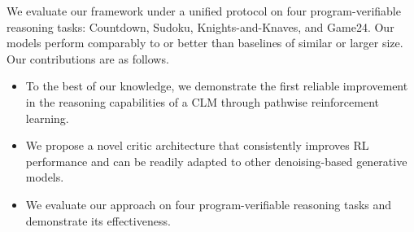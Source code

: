 

We evaluate our framework under a unified protocol on four program-verifiable reasoning tasks: Countdown, Sudoku, Knights-and-Knaves, and Game24. 
Our models perform comparably to or better than baselines of similar or larger size. Our contributions are as follows.
\begin{itemize}
    \item To the best of our knowledge, we demonstrate the first reliable improvement in the reasoning capabilities of a CLM through pathwise reinforcement learning.
    \item We propose a novel critic architecture that consistently improves RL performance and can be readily adapted to other denoising-based generative models.
    \item We evaluate our approach on four program-verifiable reasoning tasks and demonstrate its effectiveness.
\end{itemize}
